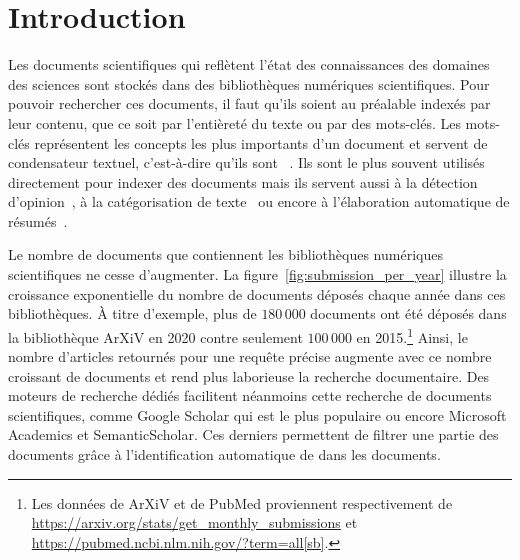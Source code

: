 \chapter{Introduction}\label{chap:introduction}

Les documents scientifiques qui reflètent l'état des connaissances des domaines des sciences sont stockés dans des bibliothèques numériques scientifiques.
Pour pouvoir rechercher ces documents, il faut qu'ils soient au préalable indexés par leur contenu, que ce soit par l'entièreté du texte ou par des mots-clés.
Les mots-clés représentent les concepts les plus importants d'un document et servent de condensateur textuel, c'est-à-dire qu'ils sont ~\cite{amar_les_1997}.
Ils sont le plus souvent utilisés directement pour indexer des documents mais ils servent aussi à la détection d'opinion~\cite{berend_opinion_2011}, à la catégorisation de texte~\cite{hulth_study_2006} ou encore à l'élaboration automatique de résumés~\cite{zhang_world_2004}.



Le nombre de documents que contiennent les bibliothèques numériques scientifiques ne cesse d'augmenter.
La figure~\ref{fig:submission_per_year} illustre la croissance exponentielle du nombre de documents déposés chaque année dans ces bibliothèques.
\`A titre d'exemple, plus de $180\,000$ documents ont été déposés dans la bibliothèque ArXiV en 2020 contre seulement $100\,000$ en 2015.\footnote{Les données de ArXiV et de PubMed proviennent respectivement de \url{https://arxiv.org/stats/get_monthly_submissions} et \url{https://pubmed.ncbi.nlm.nih.gov/?term=all[sb]}.}
%
Ainsi, le nombre d'articles retournés pour une requête précise augmente avec ce nombre croissant de documents et rend plus laborieuse la recherche documentaire.
Des moteurs de recherche dédiés facilitent néanmoins cette recherche de documents scientifiques, comme Google Scholar qui est le plus populaire ou encore Microsoft Academics et SemanticScholar. Ces derniers permettent de filtrer une partie des documents grâce à l'identification automatique de  dans les documents.

